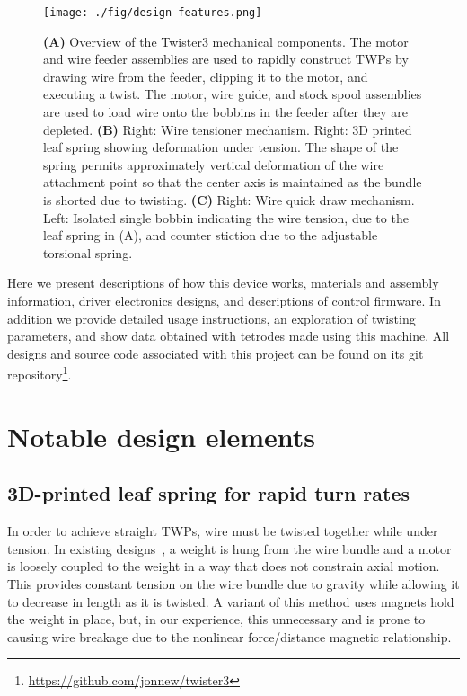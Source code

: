 \documentclass[11pt,a4paper]{article}
\begin{document}
\begin{figure}
\centering \texttt{[image: ./fig/design-features.png]}
\caption{\textbf{(A)} Overview of the Twister3 mechanical components. The
    motor and wire feeder assemblies are used to rapidly construct TWPs by
    drawing wire from the feeder, clipping it to the motor, and executing a
    twist. The motor, wire guide, and stock spool assemblies are used to
    load wire onto the bobbins in the feeder after they are depleted.
    \textbf{(B)} Right: Wire tensioner mechanism. Right: 3D printed
    leaf spring showing deformation under tension. The shape of the spring
    permits approximately vertical deformation of the wire attachment point
    so that the center axis is maintained as the bundle is shorted due to
    twisting. \textbf{(C)} Right: Wire quick draw mechanism. Left: Isolated
    single bobbin indicating the wire tension, due to the leaf spring in (A),
    and counter stiction due to the adjustable torsional spring.}
\label{f:design-features}
\end{figure}

Here we present descriptions of how this device works, materials and assembly
information, driver electronics designs, and descriptions of control firmware.
In addition we provide detailed usage instructions, an exploration of twisting
parameters, and show data obtained with tetrodes made using this machine. All
designs and source code associated with this project can be found on its git
repository\footnote{\url{https://github.com/jonnew/twister3}}.

\section{Notable design elements}

\subsection{3D-printed leaf spring for rapid turn rates}
In order to achieve straight TWPs, wire must be twisted together while under
tension. In existing designs~\cite{}, a weight is hung from the wire bundle and
a motor is loosely coupled to the weight in a way that does not constrain axial
motion. This provides constant tension on the wire bundle due to gravity while
allowing it to decrease in length as it is twisted. A variant of this method
uses magnets hold the weight in place, but, in our experience, this unnecessary
and is prone to causing wire breakage due to the nonlinear force/distance
magnetic relationship.
\end{document}
